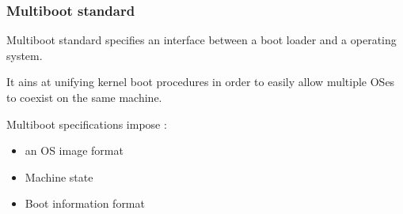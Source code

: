 %
%
%

\begin{frame}
  \frametitle{Multiboot standard}


  Multiboot standard specifies an interface between a boot loader and a operating system.

  \-

  It ains at unifying kernel boot procedures in order to easily allow multiple OSes to coexist on the same machine.

  \-

  Multiboot specifications impose :

  \begin{itemize}
  \item an OS image format
  \item Machine state
  \item Boot information format
  \end{itemize}

\end{frame}

%
%
%

